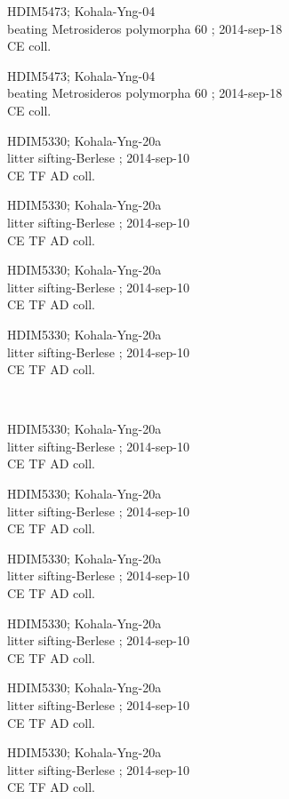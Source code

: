 \documentclass[2pt]{extarticle}
\begin{document}
\noindent
\parbox{0.16\textwidth}{\tiny \raggedright \rule[-0.3\baselineskip]{0pt}{10pt}HDIM5473; Kohala-Yng-04\\ beating Metrosideros polymorpha 60 ; 2014-sep-18\\ CE coll.}
\parbox{0.16\textwidth}{\tiny \raggedright \rule[-0.3\baselineskip]{0pt}{10pt}HDIM5473; Kohala-Yng-04\\ beating Metrosideros polymorpha 60 ; 2014-sep-18\\ CE coll.}
\parbox{0.16\textwidth}{\tiny \raggedright \rule[-0.3\baselineskip]{0pt}{10pt}HDIM5330; Kohala-Yng-20a\\ litter sifting-Berlese  ; 2014-sep-10\\ CE TF AD coll.}
\parbox{0.16\textwidth}{\tiny \raggedright \rule[-0.3\baselineskip]{0pt}{10pt}HDIM5330; Kohala-Yng-20a\\ litter sifting-Berlese  ; 2014-sep-10\\ CE TF AD coll.}
\parbox{0.16\textwidth}{\tiny \raggedright \rule[-0.3\baselineskip]{0pt}{10pt}HDIM5330; Kohala-Yng-20a\\ litter sifting-Berlese  ; 2014-sep-10\\ CE TF AD coll.}
\parbox{0.16\textwidth}{\tiny \raggedright \rule[-0.3\baselineskip]{0pt}{10pt}HDIM5330; Kohala-Yng-20a\\ litter sifting-Berlese  ; 2014-sep-10\\ CE TF AD coll.} \\ 
\vspace{0.001in} 

\noindent
\parbox{0.16\textwidth}{\tiny \raggedright \rule[-0.3\baselineskip]{0pt}{10pt}HDIM5330; Kohala-Yng-20a\\ litter sifting-Berlese  ; 2014-sep-10\\ CE TF AD coll.}
\parbox{0.16\textwidth}{\tiny \raggedright \rule[-0.3\baselineskip]{0pt}{10pt}HDIM5330; Kohala-Yng-20a\\ litter sifting-Berlese  ; 2014-sep-10\\ CE TF AD coll.}
\parbox{0.16\textwidth}{\tiny \raggedright \rule[-0.3\baselineskip]{0pt}{10pt}HDIM5330; Kohala-Yng-20a\\ litter sifting-Berlese  ; 2014-sep-10\\ CE TF AD coll.}
\parbox{0.16\textwidth}{\tiny \raggedright \rule[-0.3\baselineskip]{0pt}{10pt}HDIM5330; Kohala-Yng-20a\\ litter sifting-Berlese  ; 2014-sep-10\\ CE TF AD coll.}
\parbox{0.16\textwidth}{\tiny \raggedright \rule[-0.3\baselineskip]{0pt}{10pt}HDIM5330; Kohala-Yng-20a\\ litter sifting-Berlese  ; 2014-sep-10\\ CE TF AD coll.}
\parbox{0.16\textwidth}{\tiny \raggedright \rule[-0.3\baselineskip]{0pt}{10pt}HDIM5330; Kohala-Yng-20a\\ litter sifting-Berlese  ; 2014-sep-10\\ CE TF AD coll.} \\ 
\vspace{0.001in} 
\end{document}
